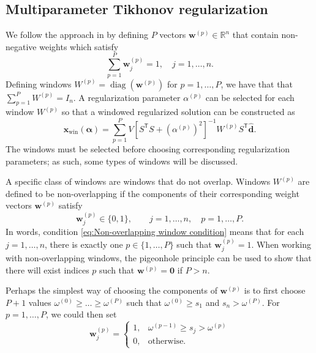 \documentclass[12pt]{article}
\newcommand{\dVec}{\mathbf{d}}	%
\newcommand{\xVec}{\mathbf{x}}	%
\newcommand{\wVec}{\mathbf{w}}	%
\newcommand{\trans}[1]{{#1}^\mathsf{T}}	%
\newcommand{\inv}[1]{{#1}^{-1}}	%
\DeclareMathOperator{\diag}{diag}	%
\newcommand{\dft}[1]{\widehat{#1}}	%
\newcommand{\regparam}{\alpha}  %
\newcommand{\regparamVec}{\bm{\regparam}}   %
\newcommand{\xWin}{\xVec_{\text{win}}}	%
\newcommand{\zeroVec}{\bm{0}}	%
\newcommand{\singular}{s}	%
\begin{document}
\subsection{Multiparameter Tikhonov regularization} \label{sec:Multiparameter}
We follow the approach in \cite{ChungEasleyOLeary} by defining $P$ vectors $\wVec^{(p)} \in \mathbb{R}^n$ that contain non-negative weights which satisfy
\begin{equation}
\label{eq:Weights}
\sum_{p=1}^{P} \wVec_j^{(p)} = 1, \quad j = 1,\ldots,n.
\end{equation}
Defining windows $W^{(p)} = \diag\left(\wVec^{(p)}\right)$ for $p = 1,\ldots,P$, we have that that $\sum_{p=1}^P W^{(p)} = I_n$. A regularization parameter $\regparam^{(p)}$ can be selected for each window $W^{(p)}$ so that a windowed regularized solution can be constructed as
\begin{equation}
\label{eq:TikSolWindow}
\xWin(\regparamVec) = \sum_{p=1}^P V\inv{\left[\trans{S}S + (\regparam^{(p)})^2\right]}W^{(p)}\trans{S}\dft{\dVec}.
\end{equation}
The windows must be selected before choosing corresponding regularization parameters; as such, some types of windows will be discussed. \par
A specific class of windows are windows that do not overlap. Windows $W^{(p)}$ are defined to be non-overlapping if the components of their corresponding weight vectors $\wVec^{(p)}$ satisfy
\begin{equation}
\label{eq:Non-overlapping window condition}
    \wVec_j^{(p)} \in \{0,1\}, \qquad j = 1,\ldots,n, \quad p = 1,\ldots,P.
\end{equation}
In words, condition \eqref{eq:Non-overlapping window condition} means that for each $j = 1,\ldots,n$, there is exactly one $p \in \{1,\ldots,P\}$ such that $\wVec_j^{(p)} = 1$. When working with non-overlapping windows, the pigeonhole principle \cite{DummitFoote3} can be used to show that there will exist indices $p$ such that $\wVec^{(p)} = \zeroVec$ if $P > n$. \par
Perhaps the simplest way of choosing the components of $\wVec^{(p)}$ is to first choose $P+1$ values $\omega^{(0)} \geq \ldots \geq \omega^{(P)}$ such that $\omega^{(0)} \geq \singular_1$ and $\singular_n > \omega^{(P)}$. For $p = 1,\ldots,P$, we could then set
\begin{equation}
\label{eq:Non-overlapping windows}
\wVec_j^{(p)} = \begin{cases}
1, & \omega^{(p-1)} \geq \singular_j > \omega^{(p)} \\
0, & \text{otherwise.}
\end{cases}
\end{equation}
\end{document}
